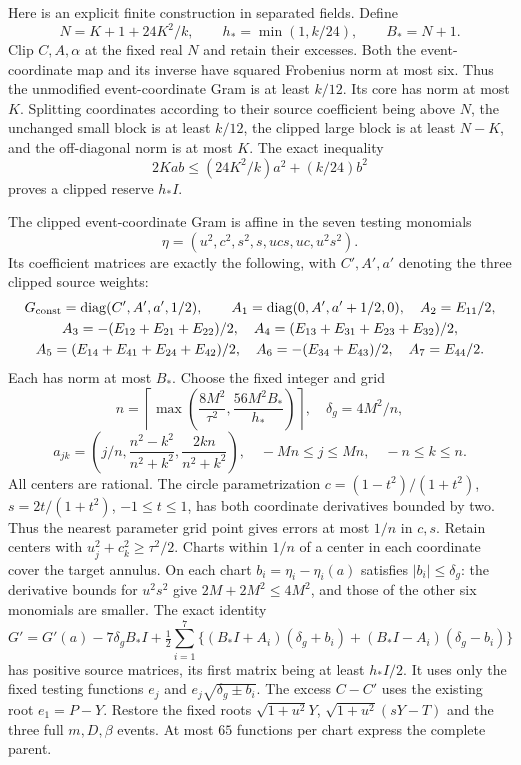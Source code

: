\documentclass[11pt]{article}
\begin{document}
Here is an explicit finite construction in separated fields. Define
\[
 N=K+1+24K^2/k,\qquad h_* =\min(1,k/24),\qquad B_*=N+1.
\]
Clip $C,A,\alpha$ at the fixed real $N$ and retain their excesses.
Both the event-coordinate map and its inverse have squared Frobenius
norm at most six. Thus the unmodified event-coordinate Gram is at
least $k/12$. Its core has norm at most $K$.
Splitting coordinates according to their source coefficient being
above $N$, the unchanged small block is at least $k/12$, the clipped
large block is at least $N-K$, and the off-diagonal norm is at most $K$.
The exact inequality
\[
 2Kab\le(24K^2/k)a^2+(k/24)b^2
\]
proves a clipped reserve $h_*I$.

The clipped event-coordinate Gram is affine in the seven testing
monomials
\[
 \eta=(u^2,c^2,s^2,s,ucs,uc,u^2s^2).
\]
Its coefficient matrices are exactly the following, with
$C',A',a'$ denoting the three clipped source weights:
\begin{gather*}
 G_{\rm const}=\operatorname{diag}(C',A',a',1/2),\qquad
 A_1=\operatorname{diag}(0,A',a'+1/2,0),\quad A_2=E_{11}/2,\\
 A_3=-(E_{12}+E_{21}+E_{22})/2,\quad
 A_4=(E_{13}+E_{31}+E_{23}+E_{32})/2,\\
 A_5=(E_{14}+E_{41}+E_{24}+E_{42})/2,\quad
 A_6=-(E_{34}+E_{43})/2,\quad A_7=E_{44}/2.
\end{gather*}
Each has norm at most $B_*$.
Choose the fixed integer and grid
\[
 n=\left\lceil\max\left(\frac{8M^2}{\tau^2},
                         \frac{56M^2B_*}{h_*}\right)\right\rceil,
 \quad \delta_g=4M^2/n,
\]
\[
 a_{jk}=\left(j/n,\frac{n^2-k^2}{n^2+k^2},
                         \frac{2kn}{n^2+k^2}\right),
 \quad -Mn\le j\le Mn,\quad -n\le k\le n.
\]
All centers are rational. The circle parametrization
$c=(1-t^2)/(1+t^2)$, $s=2t/(1+t^2)$, $-1\le t\le1$,
has both coordinate derivatives bounded by two. Thus the nearest
parameter grid point gives errors at most $1/n$ in $c,s$.
Retain centers with $u_j^2+c_k^2\ge\tau^2/2$.
Charts within $1/n$ of a center in each coordinate cover the target
annulus. On each chart $b_i=\eta_i-\eta_i(a)$ satisfies
$|b_i|\le\delta_g$: the derivative bounds for $u^2s^2$ give
$2M+2M^2\le4M^2$, and those of the other six monomials are smaller.
The exact identity
\[
 G'=G'(a)-7\delta_gB_*I
 +\tfrac12\sum_{i=1}^7
 \{(B_*I+A_i)(\delta_g+b_i)+(B_*I-A_i)(\delta_g-b_i)\}
\]
has positive source matrices, its first matrix being at least
$h_*I/2$. It uses only the fixed testing functions
$e_j$ and $e_j\sqrt{\delta_g\pm b_i}$.
The excess $C-C'$ uses the existing root $e_1=P-Y$.
Restore the fixed roots $\sqrt{1+u^2}Y$,
$\sqrt{1+u^2}(sY-T)$ and the three full $m,D,\beta$ events.
At most $65$ functions per chart express the complete parent.
\end{document}
